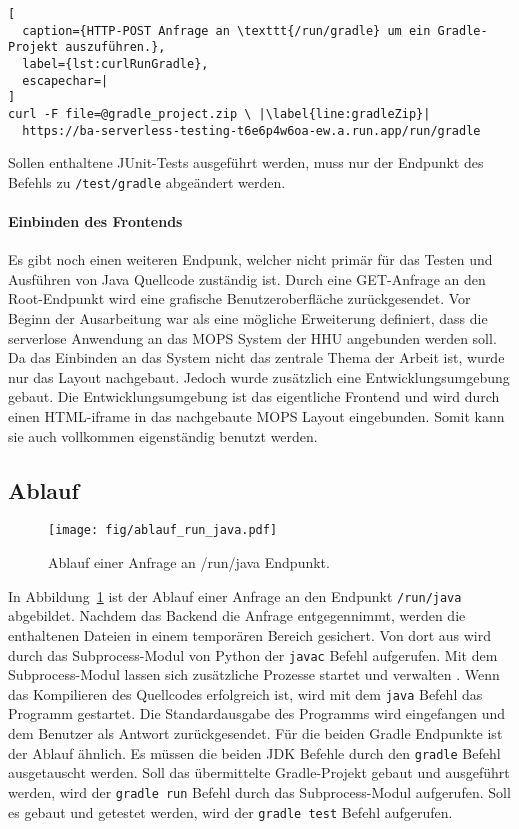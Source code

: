 \begin{lstlisting}[
  caption={HTTP-POST Anfrage an \texttt{/run/gradle} um ein Gradle-Projekt auszuführen.},
  label={lst:curlRunGradle},
  escapechar=|
]
curl -F file=@gradle_project.zip \ |\label{line:gradleZip}|
  https://ba-serverless-testing-t6e6p4w6oa-ew.a.run.app/run/gradle
\end{lstlisting}

Sollen enthaltene JUnit-Tests ausgeführt werden,
muss nur der Endpunkt des Befehls zu \texttt{/test/gradle} abgeändert werden.

\paragraph{Einbinden des Frontends} Es gibt noch einen weiteren Endpunk, welcher
nicht primär für das Testen und Ausführen von Java Quellcode zuständig ist.
Durch eine GET-Anfrage an den Root-Endpunkt wird eine grafische Benutzeroberfläche zurückgesendet.
Vor Beginn der Ausarbeitung war als eine mögliche Erweiterung definiert, dass die serverlose Anwendung an
das MOPS System der HHU angebunden werden soll. Da das Einbinden an das System nicht
das zentrale Thema der Arbeit ist, wurde nur das Layout nachgebaut.
Jedoch wurde zusätzlich eine Entwicklungsumgebung gebaut.
Die Entwicklungsumgebung ist das eigentliche Frontend und wird durch einen HTML-iframe
in das nachgebaute MOPS Layout eingebunden. Somit kann sie auch vollkommen eigenständig benutzt werden.

\subsection{Ablauf}
\begin{figure}
  \centering
  \texttt{[image: fig/ablauf\_run\_java.pdf]}
  \caption{Ablauf einer Anfrage an /run/java Endpunkt.}
  \label{fig:ablauf_run_java}
\end{figure}

In Abbildung~\ref{fig:ablauf_run_java} ist der Ablauf einer Anfrage an den Endpunkt
\texttt{/run/java} abgebildet. Nachdem das Backend die Anfrage entgegennimmt,
werden die enthaltenen Dateien in einem temporären Bereich gesichert.
Von dort aus wird durch das Subprocess-Modul von Python der \texttt{javac} Befehl aufgerufen.
Mit dem Subprocess-Modul lassen sich zusätzliche Prozesse startet und verwalten \cite{PythonSubprocess}.
Wenn das Kompilieren des Quellcodes erfolgreich ist, wird mit dem \texttt{java} Befehl
das Programm gestartet. Die Standardausgabe des Programms wird eingefangen und
dem Benutzer als Antwort zurückgesendet. Für die beiden Gradle Endpunkte ist der Ablauf ähnlich.
Es müssen die beiden JDK Befehle durch den \texttt{gradle}
Befehl ausgetauscht werden. Soll das übermittelte Gradle-Projekt gebaut und ausgeführt
werden, wird der \texttt{gradle run} Befehl durch das Subprocess-Modul aufgerufen.
Soll es gebaut und getestet werden, wird der \texttt{gradle test} Befehl aufgerufen.

